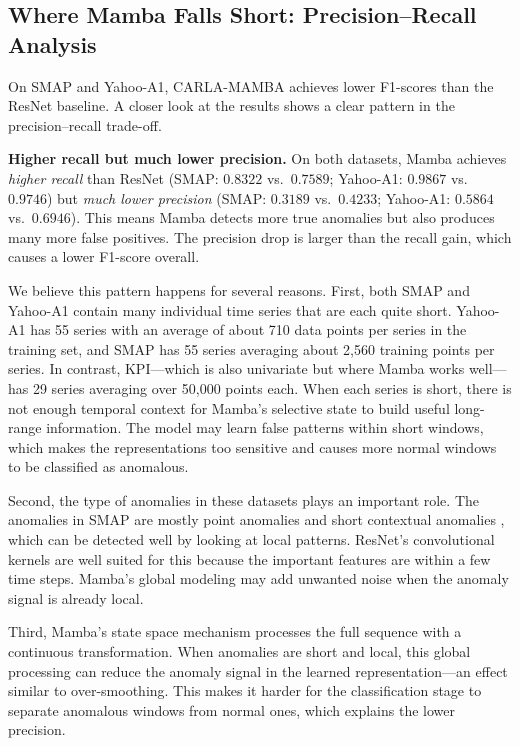 \documentclass{svproc}
\begin{document}
\subsection{Where Mamba Falls Short: Precision--Recall Analysis}

On SMAP and Yahoo-A1, CARLA-MAMBA achieves lower F1-scores than the ResNet baseline. A closer look at the results shows a clear pattern in the precision--recall trade-off.

\textbf{Higher recall but much lower precision.} On both datasets, Mamba achieves \emph{higher recall} than ResNet (SMAP: $0.8322$ vs.\ $0.7589$; Yahoo-A1: $0.9867$ vs.\ $0.9746$) but \emph{much lower precision} (SMAP: $0.3189$ vs.\ $0.4233$; Yahoo-A1: $0.5864$ vs.\ $0.6946$). This means Mamba detects more true anomalies but also produces many more false positives. The precision drop is larger than the recall gain, which causes a lower F1-score overall.

We believe this pattern happens for several reasons. First, both SMAP and Yahoo-A1 contain many individual time series that are each quite short. Yahoo-A1 has 55 series with an average of about 710 data points per series in the training set, and SMAP has 55 series averaging about 2{,}560 training points per series. In contrast, KPI---which is also univariate but where Mamba works well---has 29 series averaging over 50{,}000 points each. When each series is short, there is not enough temporal context for Mamba's selective state to build useful long-range information. The model may learn false patterns within short windows, which makes the representations too sensitive and causes more normal windows to be classified as anomalous.

Second, the type of anomalies in these datasets plays an important role. The anomalies in SMAP are mostly point anomalies and short contextual anomalies \cite{hundman2018detecting}, which can be detected well by looking at local patterns. ResNet's convolutional kernels are well suited for this because the important features are within a few time steps. Mamba's global modeling may add unwanted noise when the anomaly signal is already local.

Third, Mamba's state space mechanism processes the full sequence with a continuous transformation. When anomalies are short and local, this global processing can reduce the anomaly signal in the learned representation---an effect similar to over-smoothing. This makes it harder for the classification stage to separate anomalous windows from normal ones, which explains the lower precision.
\end{document}
